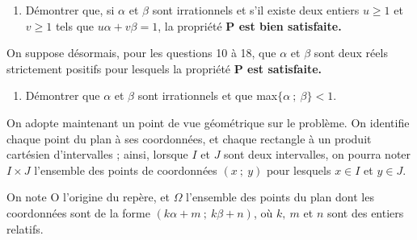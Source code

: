 \documentclass[landscape,twocolumn,leqno,a4paper,10pt]{report} %
\renewcommand{\textbf}[1]{\begingroup\bfseries\mathversion{bold}#1\endgroup}		%
\begin{document}
\medskip

\begin{enumerate}[resume]
\item Démontrer que, si $\alpha$ et $\beta$ sont irrationnels et s'il existe deux entiers $u \geqslant 1$ et $v \geqslant 1$ tels que $u\alpha  + v\beta = 1$, la propriété \textbf{P}{\small $\cap$} est bien satisfaite.
\end{enumerate}

On suppose désormais, pour les questions 10 à 18, que $\alpha$ et $\beta$ sont deux réels strictement positifs pour lesquels la propriété \textbf{P}{\small $\cap$} est satisfaite.

\begin{enumerate}[resume]
\item Démontrer que $\alpha$ et $\beta$ sont irrationnels et que max$\{\alpha ~;~ \beta\} < 1$.
\end{enumerate}

\medskip

On adopte maintenant un point de vue géométrique sur le problème. On identifie chaque point du plan à ses coordonnées, et chaque rectangle à un produit cartésien d'intervalles ; ainsi, lorsque $I$ et $J$ sont deux intervalles, on pourra noter $I \times J$ l'ensemble des points de coordonnées $(x~;~y)$ pour lesquels $x \in I$ et $y \in J$.

On note O l'origine du repère, et $\Omega$ l'ensemble des points du plan dont les coordonnées sont de la forme $(k\alpha + m~;~k\beta + n)$, où $k,\:m$ et $n$ sont des entiers relatifs.
\end{document}
